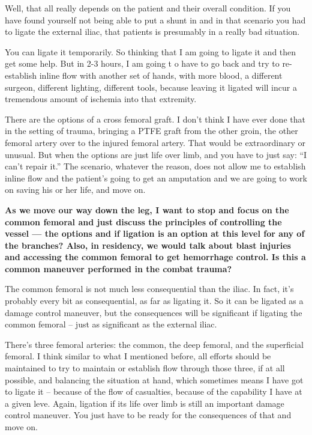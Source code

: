 \documentclass[
]{book}
\begin{document}
Well, that all really depends on the patient and their overall
condition. If you have found yourself not being able to put a shunt in
and in that scenario you had to ligate the external iliac, that patients
is presumably in a really bad situation.

You can ligate it temporarily. So thinking that I am going to ligate it
and then get some help. But in 2-3 hours, I am going t o have to go back
and try to re-establish inline flow with another set of hands, with more
blood, a different surgeon, different lighting, different tools, because
leaving it ligated will incur a tremendous amount of ischemia into that
extremity.

There are the options of a cross femoral graft. I don't think I have
ever done that in the setting of trauma, bringing a PTFE graft from the
other groin, the other femoral artery over to the injured femoral
artery. That would be extraordinary or unusual. But when the options are
just life over limb, and you have to just say: ``I can't repair it.'' The
scenario, whatever the reason, does not allow me to establish inline
flow and the patient's going to get an amputation and we are going to
work on saving his or her life, and move on.

\textbf{As we move our way down the leg, I want to stop and focus on the
common femoral and just discuss the principles of controlling the vessel
--- the options and if ligation is an option at this level for any of
the branches? Also, in residency, we would talk about blast injuries and
accessing the common femoral to get hemorrhage control. Is this a common
maneuver performed in the combat trauma?}

The common femoral is not much less consequential than the iliac. In
fact, it's probably every bit as consequential, as far as ligating it.
So it can be ligated as a damage control maneuver, but the consequences
will be significant if ligating the common femoral -- just as
significant as the external iliac.

There's three femoral arteries: the common, the deep femoral, and the
superficial femoral. I think similar to what I mentioned before, all
efforts should be maintained to try to maintain or establish flow
through those three, if at all possible, and balancing the situation at
hand, which sometimes means I have got to ligate it -- because of the
flow of casualties, because of the capability I have at a given leve.
Again, ligation if its life over limb is still an important damage
control maneuver. You just have to be ready for the consequences of that
and move on.
\end{document}
